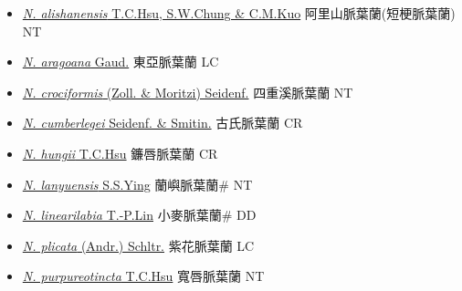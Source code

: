 \begin{itemize}
  \begin{itemize}
        \item[] \href{http://www.theplantlist.org/tpl1.1/search?q=Nervilia+alishanensis}{\textit{N. alishanensis} T.C.Hsu, S.W.Chung \& C.M.Kuo}     阿里山脈葉蘭(短梗脈葉蘭)   NT
        \item[] \href{http://www.theplantlist.org/tpl1.1/search?q=Nervilia+aragoana}{\textit{N. aragoana} Gaud.}   東亞脈葉蘭 LC
        \item[] \href{http://www.theplantlist.org/tpl1.1/search?q=Nervilia+crociformis}{\textit{N. crociformis} (Zoll. \& Moritzi) Seidenf.}   四重溪脈葉蘭 NT
        \item[] \href{http://www.theplantlist.org/tpl1.1/search?q=Nervilia+cumberlegei}{\textit{N. cumberlegei} Seidenf. \& Smitin.}   古氏脈葉蘭 CR
        \item[] \href{http://www.theplantlist.org/tpl1.1/search?q=Nervilia+hungii}{\textit{N. hungii} T.C.Hsu}   鐮唇脈葉蘭 CR
        \item[] \href{http://www.theplantlist.org/tpl1.1/search?q=Nervilia+lanyuensis}{\textit{N. lanyuensis} S.S.Ying}   蘭嶼脈葉蘭\# NT
        \item[] \href{http://www.theplantlist.org/tpl1.1/search?q=Nervilia+linearilabia}{\textit{N. linearilabia} T.-P.Lin}   小麥脈葉蘭\# DD
        \item[] \href{http://www.theplantlist.org/tpl1.1/search?q=Nervilia+plicata}{\textit{N. plicata} (Andr.) Schltr.}   紫花脈葉蘭 LC
        \item[] \href{http://www.theplantlist.org/tpl1.1/search?q=Nervilia+purpureotincta}{\textit{N. purpureotincta} T.C.Hsu}   寬唇脈葉蘭 NT

\end{itemize}
\end{itemize}
